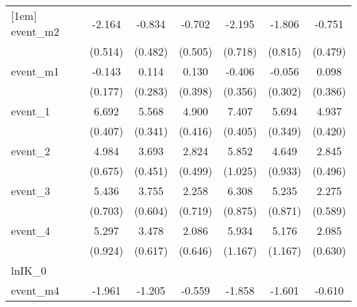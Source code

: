 {\begin{tabular}{l*{6}{c}}
[1em]
event\_m2    &      -2.164\sym{***}&      -0.834         &      -0.702         &      -2.195\sym{**} &      -1.806\sym{*}  &      -0.751         \\
            &     (0.514)         &     (0.482)         &     (0.505)         &     (0.718)         &     (0.815)         &     (0.479)         \\
[1em]
event\_m1    &      -0.143         &       0.114         &       0.130         &      -0.406         &      -0.056         &       0.098         \\
            &     (0.177)         &     (0.283)         &     (0.398)         &     (0.356)         &     (0.302)         &     (0.386)         \\
[1em]
event\_1     &       6.692\sym{***}&       5.568\sym{***}&       4.900\sym{***}&       7.407\sym{***}&       5.694\sym{***}&       4.937\sym{***}\\
            &     (0.407)         &     (0.341)         &     (0.416)         &     (0.405)         &     (0.349)         &     (0.420)         \\
[1em]
event\_2     &       4.984\sym{***}&       3.693\sym{***}&       2.824\sym{***}&       5.852\sym{***}&       4.649\sym{***}&       2.845\sym{***}\\
            &     (0.675)         &     (0.451)         &     (0.499)         &     (1.025)         &     (0.933)         &     (0.496)         \\
[1em]
event\_3     &       5.436\sym{***}&       3.755\sym{***}&       2.258\sym{**} &       6.308\sym{***}&       5.235\sym{***}&       2.275\sym{***}\\
            &     (0.703)         &     (0.604)         &     (0.719)         &     (0.875)         &     (0.871)         &     (0.589)         \\
[1em]
event\_4     &       5.297\sym{***}&       3.478\sym{***}&       2.086\sym{**} &       5.934\sym{***}&       5.176\sym{***}&       2.085\sym{***}\\
            &     (0.924)         &     (0.617)         &     (0.646)         &     (1.167)         &     (1.167)         &     (0.630)         \\
\hline
lnIK\_0      &                     &                     &                     &                     &                     &                     \\
event\_m4    &      -1.961\sym{***}&      -1.205\sym{*}  &      -0.559         &      -1.858\sym{**} &      -1.601\sym{**} &      -0.610         \\

\end{tabular}}

